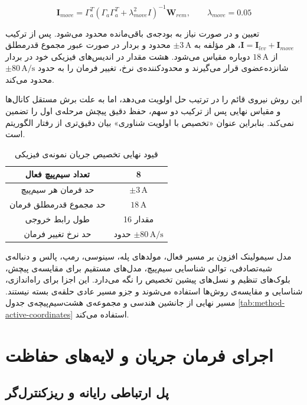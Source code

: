 \begin{equation}
	\mathbf I_{move}=\Gamma_a^T
	(\Gamma_a\Gamma_a^T+\lambda_{move}^2I)^{-1}\mathbf W_{rem},
	\qquad \lambda_{move}=0.05
	\label{eq:method-motion-allocation}
\end{equation}

تعیین و در صورت نیاز به بودجه‌ی باقی‌مانده محدود می‌شود. پس از ترکیب $\mathbf I=\mathbf I_{lev}+\mathbf I_{move}$، هر مؤلفه به $\pm3\,\mathrm A$ محدود و بردار در صورت عبور مجموع قدرمطلق از $18\,\mathrm A$ دوباره مقیاس می‌شود. هشت مقدار در اندیس‌های فیزیکی خود در بردار شانزده‌عضوی قرار می‌گیرند و محدودکننده‌ی نرخ، تغییر فرمان را به حدود $\pm80\,\mathrm{A/s}$ محدود می‌کند.

این روش نیروی قائم را در ترتیب حل اولویت می‌دهد، اما به علت برش مستقل کانال‌ها و مقیاس نهایی پس از ترکیب دو سهم، حفظ دقیق پیچش مرحله‌ی اول را تضمین نمی‌کند. بنابراین عنوان «تخصیص با اولویت شناوری» بیان دقیق‌تری از رفتار الگوریتم است.

\begin{table}[htbp]
	\centering
	\caption{قیود نهایی تخصیص جریان نمونه‌ی فیزیکی}
	\label{tab:method-current-constraints-physical}
	\begin{tabular}{|c|c|}
		\hline
		تعداد سیم‌پیچ فعال & 8\\ \hline
		حد فرمان هر سیم‌پیچ & $\pm3\,\mathrm A$\\ \hline
		حد مجموع قدرمطلق فرمان & $18\,\mathrm A$\\ \hline
		طول رابط خروجی & 16 مقدار\\ \hline
		حد نرخ تغییر فرمان & حدود $\pm80\,\mathrm{A/s}$\\ \hline
	\end{tabular}
\end{table}

مدل سیمولینک افزون بر مسیر فعال، مولدهای پله، سینوسی، رمپ، پالس و دنباله‌ی شبه‌تصادفی، توالی شناسایی سیم‌پیچ، مدل‌های مستقیم برای مقایسه‌ی پیچش، بلوک‌های تنظیم  و نسل‌های پیشین تخصیص را نگه می‌دارد. این اجزا برای راه‌اندازی، شناسایی و مقایسه‌ی روش‌ها استفاده می‌شوند و جزو مسیر عادی حلقه‌ی بسته نیستند. مسیر نهایی از جانشین هندسی و مجموعه‌ی هشت‌سیم‌پیچه‌ی جدول \ref{tab:method-active-coordinates} استفاده می‌کند.

\section{اجرای فرمان جریان و لایه‌های حفاظت}
\label{sec:method-current-driver}

\subsection{پل ارتباطی رایانه و ریزکنترل‌گر}


